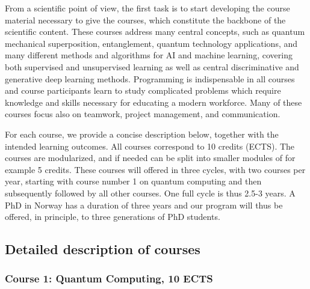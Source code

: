 \documentclass{scrreprt}
\begin{document}
From a scientific point of view, the first task is to start developing the course material necessary to give the courses, which constitute the backbone of the scientific content.
These courses address many central concepts, such as quantum
mechanical superposition, entanglement, quantum technology applications, and many
different methods and algorithms for AI and machine learning, covering
both supervised and unsupervised learning as well as central
discriminative and generative deep learning methods. Programming is
indispensable in all courses and course participants learn to
study complicated problems which require knowledge and skills
necessary for educating a modern workforce. Many of these courses
focus also on teamwork, project management, and communication.
\begin{comment}
The courses are
\begin{enumerate}
\item \textit{Quantum Computing},
\item \textit{Quantum Information Theory},
\item \textit{Building Quantum Hardware},
\item \textit{Quantum Metrology and Sensing}, and
\item \textit{Quantum Machine Learning}.
\end{enumerate}
\end{comment}
For each course, we provide a concise description below, together with the intended learning outcomes.
All courses correspond to 10 credits (ECTS). The courses are modularized, and if needed can be split into smaller modules of for example 5 credits. These courses will offered in three cycles, with two courses per year, starting with course number 1 on quantum computing and then subsequently followed by all other courses. One full cycle is thus 2.5-3 years. A PhD in Norway has a duration of three years and our program will thus be offered, in principle,  to three generations of PhD students. %

\subsection{Detailed description of courses}
\subsubsection{Course 1: Quantum Computing, 10 ECTS}
\end{document}
